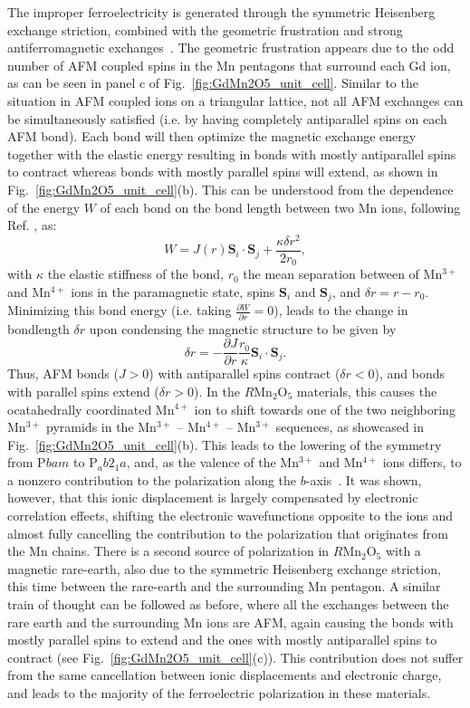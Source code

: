 The improper ferroelectricity is generated through the symmetric Heisenberg exchange striction, combined with the geometric frustration and strong antiferromagnetic exchanges~\cite{Choi2008}.
The geometric frustration appears due to the odd number of AFM coupled spins in the Mn pentagons that surround each Gd ion, as can be seen in panel c of Fig.~\ref{fig:GdMn2O5_unit_cell}.
Similar to the situation in AFM coupled ions on a triangular lattice, not all AFM exchanges can be simultaneously satisfied (i.e. by having completely antiparallel spins on each AFM bond).
Each bond will then optimize the magnetic exchange energy together with the elastic energy resulting in bonds with mostly antiparallel spins to contract whereas bonds with mostly parallel spins will extend, as shown in Fig.~\ref{fig:GdMn2O5_unit_cell}(b). This can be understood from the dependence of the energy $W$ of each bond on the bond length between two Mn ions, following Ref. \cite{Harris1972}, as:
\begin{equation}
	W = J(r)\mathbf{S}_i \cdot \mathbf{S}_j + \frac{\kappa \delta r^2}{2r_0},
\end{equation}
with $\kappa$ the elastic stiffness of the bond, $r_0$ the mean separation between of Mn$^{3+}$ and Mn$^{4+}$ ions in the paramagnetic state, spins $\mathbf{S}_i$ and $\mathbf{S}_j$, and $\delta r = r - r_0$.
Minimizing this bond energy (i.e. taking $\frac{\partial W}{\partial r} = 0$), leads to the change in bondlength $\delta r$ upon condensing the magnetic structure to be given by 
\begin{equation}
	\delta r = -\frac{\partial J}{\partial r}\frac{r_0}{\kappa}\mathbf{S}_i \cdot \mathbf{S}_j. 
\end{equation}
Thus, AFM bonds ($J > 0$) with antiparallel spins contract ($\delta r < 0$), and bonds with parallel spins extend ($\delta r > 0$).
In the $R$Mn$_2$O$_5$ materials, this causes the ocatahedrally coordinated Mn$^{4+}$ ion to shift towards one of the two neighboring Mn$^{3+}$ pyramids in the Mn$^{3+}$ -- Mn$^{4+}$ -- Mn$^{3+}$ sequences, as showcased in Fig.~\ref{fig:GdMn2O5_unit_cell}(b).
This leads to the lowering of the symmetry from P$bam$ to P$_ab2_1a$, and, as the valence of the Mn$^{3+}$ and Mn$^{4+}$ ions differs, to a nonzero contribution to the polarization along the $b$-axis~\cite{Khomskii2009}.
It was shown, however, that this ionic displacement is largely compensated by electronic correlation effects, shifting the electronic wavefunctions opposite to the ions and almost fully cancelling the contribution to the polarization that originates from the Mn chains.
There is a second source of polarization in $R$Mn$_2$O$_5$ with a magnetic rare-earth, also due to the symmetric Heisenberg exchange striction, this time between the rare-earth and the surrounding Mn pentagon.
A similar train of thought can be followed as before, where all the exchanges between the rare earth and the surrounding Mn ions are AFM, again causing the bonds with mostly parallel spins to extend and the ones with mostly antiparallel spins to contract (see Fig.~\ref{fig:GdMn2O5_unit_cell}(c)).
This contribution does not suffer from the same cancellation between ionic displacements and electronic charge, and leads to the majority of the ferroelectric polarization in these materials.


